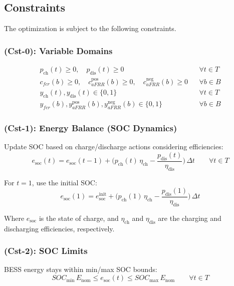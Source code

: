 \documentclass[11pt, a4paper]{article}
\begin{document}
\subsection*{Constraints}

The optimization is subject to the following constraints.

\subsubsection*{(Cst-0): Variable Domains}
\begin{align}
p_{\mathrm{ch}}(t) \ge 0,\quad p_{\mathrm{dis}}(t) \ge 0 && \forall t\in T \\
c_{fcr}(b) \ge 0,\quad c^{\mathrm{pos}}_{aFRR}(b) \ge 0,\quad c^{\mathrm{neg}}_{aFRR}(b) \ge 0 && \forall b\in B \\
y_{\mathrm{ch}}(t), y_{\mathrm{dis}}(t) \in \{0,1\} && \forall t\in T \\
y_{fcr}(b), y^{\mathrm{pos}}_{aFRR}(b), y^{\mathrm{neg}}_{aFRR}(b) \in \{0,1\} && \forall b\in B
\end{align}

\subsubsection*{(Cst-1): Energy Balance (SOC Dynamics)}
Update SOC based on charge/discharge actions considering efficiencies:
\begin{equation}
e_{\mathrm{soc}}(t) = e_{\mathrm{soc}}(t-1) + \Big( p_{\mathrm{ch}}(t)\,\eta_{\mathrm{ch}} - \frac{p_{\mathrm{dis}}(t)}{\eta_{\mathrm{dis}}} \Big)\, \Delta t
    \qquad \forall t\in T    
\end{equation}

For $t=1$, use the initial SOC:
\begin{equation}
e_{\mathrm{soc}}(1) = e_{\mathrm{soc}}^{\mathrm{init}} + \Big( p_{\mathrm{ch}}(1)\,\eta_{\mathrm{ch}} - \frac{p_{\mathrm{dis}}(1)}{\eta_{\mathrm{dis}}} \Big)\, \Delta t 
\end{equation}

Where $e_{\mathrm{soc}}$ is the state of charge, and $\eta_{\mathrm{ch}}$ and $\eta_{\mathrm{dis}}$ are the charging and discharging efficiencies, respectively.

\subsubsection*{(Cst-2): SOC Limits}
BESS energy stays within min/max SOC bounds:
\begin{equation}
SOC_{\min}\,E_{\mathrm{nom}} \le e_{\mathrm{soc}}(t) \le SOC_{\max}\,E_{\mathrm{nom}} \qquad \forall t\in T
\end{equation}
\end{document}
